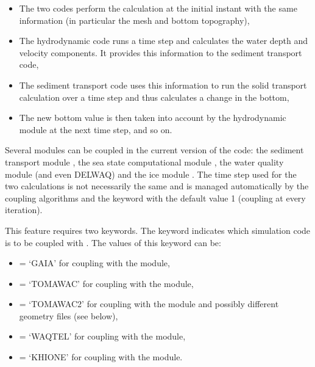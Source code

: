 \begin{itemize}
\item The two codes perform the calculation at the initial instant
with the same information (in particular the mesh and bottom topography),

\item The hydrodynamic code runs a time step and calculates the water depth
and velocity components.
It provides this information to the sediment transport code,

\item The sediment transport code uses this information to run the solid
transport calculation over a time step and thus calculates a change in the
bottom,

\item The new bottom value is then taken into account by the hydrodynamic module
at the next time step, and so on.
\end{itemize}

Several modules can be coupled in the current version of the code:
the sediment transport module \gaia,
the sea state computational module \tomawac,
the water quality module \waqtel (and even DELWAQ)
and the ice module \khione.
The time step used for the two calculations is not necessarily the same and is
managed automatically by the coupling algorithms
and the keyword  with the default value 1
(coupling at every iteration).

This feature requires two keywords.
The keyword  indicates which simulation code is to be
coupled with .
The values of this keyword can be:

\begin{itemize}
\item {} = `GAIA' for coupling with the \gaia module,

\item {} = `TOMAWAC' for coupling with the \tomawac module,

\item {} = `TOMAWAC2' for coupling with the \tomawac module
and possibly different geometry files (see below),

\item {} = `WAQTEL' for coupling with the \waqtel module,

\item {} = `KHIONE' for coupling with the \khione module.
\end{itemize}

